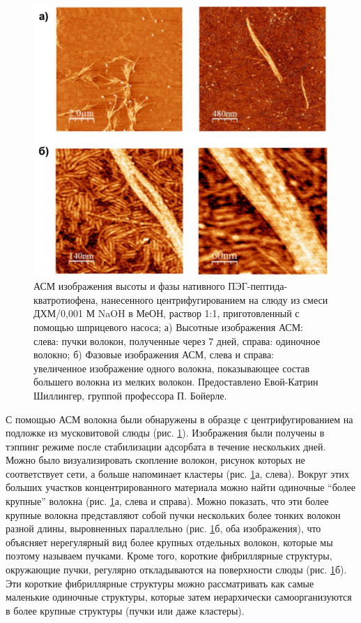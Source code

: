 \begin{figure} [H]
    \centering
    \includegraphics[width=\textwidth]{images/p4/punkt1/part4_p1_f9.pdf}
    \caption[АСМ изображения высоты и фазы нативного ПЭГ-пептида-кватротиофена]{АСМ изображения высоты и фазы нативного ПЭГ-пептида-кватротиофена, нанесенного центрифугированием на слюду из смеси ДХМ/0,001 М NaOH в МеОН, раствор 1:1, приготовленный с помощью шприцевого насоса; а) Высотные изображения АСМ: слева: пучки волокон, полученные через 7 дней, справа: одиночное волокно; б) Фазовые изображения АСМ, слева и справа: увеличенное изображение одного волокна, показывающее состав большего волокна из мелких волокон. Предоставлено Евой-Катрин Шиллингер, группой профессора П. Бойерле.}
    \label{fig:p4_p1_f9}
\end{figure}

    С помощью АСМ волокна были обнаружены в образце с центрифугированием на подложке из мусковитовой слюды (рис. \ref{fig:p4_p1_f9}). Изображения были получены в тэппинг режиме после стабилизации адсорбата в течение нескольких дней. Можно было визуализировать скопление волокон, рисунок которых не соответствует сети, а больше напоминает кластеры (рис. \ref{fig:p4_p1_f9}а, слева). Вокруг этих больших участков концентрированного материала можно найти одиночные ``более крупные'' волокна (рис. \ref{fig:p4_p1_f9}а, слева и справа). Можно показать, что эти более крупные волокна представляют собой пучки нескольких более тонких волокон разной длины, выровненных параллельно (рис. \ref{fig:p4_p1_f9}б, оба изображения), что объясняет нерегулярный вид более крупных отдельных волокон, которые мы поэтому называем пучками. Кроме того, короткие фибриллярные структуры, окружающие пучки, регулярно откладываются на поверхности слюды (рис. \ref{fig:p4_p1_f9}б). Эти короткие фибриллярные структуры можно рассматривать как самые маленькие одиночные структуры, которые затем иерархически самоорганизуются в более крупные структуры (пучки или даже кластеры).
    
